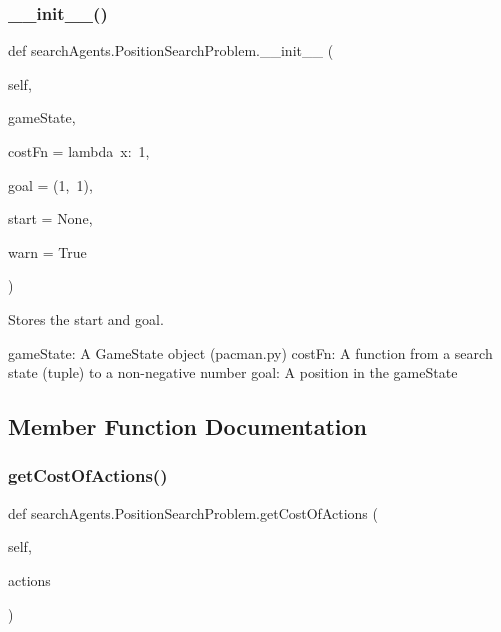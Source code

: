 \subsubsection{\texorpdfstring{\+\_\+\+\_\+init\+\_\+\+\_\+()}{\_\_init\_\_()}}
{\footnotesize\ttfamily def search\+Agents.\+Position\+Search\+Problem.\+\_\+\+\_\+init\+\_\+\+\_\+ (\begin{DoxyParamCaption}\item[{}]{self,  }\item[{}]{game\+State,  }\item[{}]{cost\+Fn = {\ttfamily lambda~x\+:~1},  }\item[{}]{goal = {\ttfamily (1,~1)},  }\item[{}]{start = {\ttfamily None},  }\item[{}]{warn = {\ttfamily True} }\end{DoxyParamCaption})}

\begin{DoxyVerb}Stores the start and goal.

gameState: A GameState object (pacman.py)
costFn: A function from a search state (tuple) to a non-negative number
goal: A position in the gameState
\end{DoxyVerb}
 

\subsection{Member Function Documentation}
\mbox{\label{classsearch_agents_1_1_position_search_problem_a31ea791f51f365a42ad8a0030b3a3c5f}} 
\subsubsection{\texorpdfstring{get\+Cost\+Of\+Actions()}{getCostOfActions()}}
{\footnotesize\ttfamily def search\+Agents.\+Position\+Search\+Problem.\+get\+Cost\+Of\+Actions (\begin{DoxyParamCaption}\item[{}]{self,  }\item[{}]{actions }\end{DoxyParamCaption})}

